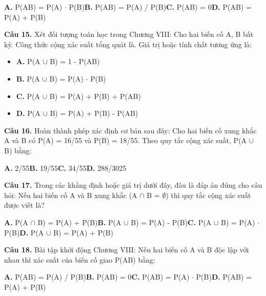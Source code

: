 \documentclass[11pt,a4paper]{article}
\begin{document}
\hspace*{1.5em}\textbf{A.} P(AB) = P(A) $\cdot$ P(B)\quad\quad \textbf{B.} P(AB) = P(A) / P(B)\quad\quad \textbf{C.} P(AB) = 0\quad\quad \textbf{D.} P(AB) = P(A) + P(B)\par\vspace{2pt}
\textbf{\color{primary} Câu 15.} Xét đối tượng toán học trong Chương VIII: Cho hai biến cố A, B bất kỳ. Công thức cộng xác suất tổng quát là. Giá trị hoặc tính chất tương ứng là:\par
\begin{itemize}\setlength{\itemsep}{1pt}\setlength{\parskip}{0pt}
  \item[] \textbf{A.} P(A $\cup$ B) = 1 - P(AB)
  \item[] \textbf{B.} P(A $\cup$ B) = P(A) $\cdot$ P(B)
  \item[] \textbf{C.} P(A $\cup$ B) = P(A) + P(B) + P(AB)
  \item[] \textbf{D.} P(A $\cup$ B) = P(A) + P(B) - P(AB)
\end{itemize}\vspace{2pt}
\textbf{\color{primary} Câu 16.} Hoàn thành phép xác định cơ bản sau đây: Cho hai biến cố xung khắc A và B có P(A) = 16/55 và P(B) = 18/55. Theo quy tắc cộng xác suất, P(A $\cup$ B) bằng:\par
\hspace*{1.5em}\textbf{A.} 2/55\quad\quad \textbf{B.} 19/55\quad\quad \textbf{C.} 34/55\quad\quad \textbf{D.} 288/3025\par\vspace{2pt}
\textbf{\color{primary} Câu 17.} Trong các khẳng định hoặc giá trị dưới đây, đâu là đáp án đúng cho câu hỏi: Nếu hai biến cố A và B xung khắc (A $\cap$ B = $\emptyset$) thì quy tắc cộng xác suất được viết là?\par
\hspace*{1.5em}\textbf{A.} P(A $\cap$ B) = P(A) + P(B)\quad\quad \textbf{B.} P(A $\cup$ B) = P(A) - P(B)\quad\quad \textbf{C.} P(A $\cup$ B) = P(A) $\cdot$ P(B)\quad\quad \textbf{D.} P(A $\cup$ B) = P(A) + P(B)\par\vspace{2pt}
\textbf{\color{primary} Câu 18.} Bài tập khởi động Chương VIII: Nếu hai biến cố A và B độc lập với nhau thì xác suất của biến cố giao P(AB) bằng:\par
\hspace*{1.5em}\textbf{A.} P(AB) = P(A) / P(B)\quad\quad \textbf{B.} P(AB) = 0\quad\quad \textbf{C.} P(AB) = P(A) $\cdot$ P(B)\quad\quad \textbf{D.} P(AB) = P(A) + P(B)\par\vspace{2pt}
\end{document}
